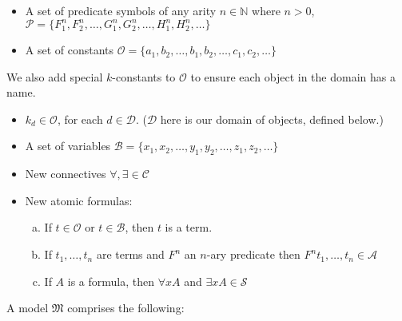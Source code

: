 \begin{itemize}
\item A set of predicate symbols of any arity $n \in\mathbb{N}$ where $n>0$, \\ $\mathcal{P}=\{F^n_1,F^n_2,\dots,G^n_1,G^n_2,\dots,H^n_1,H^n_2,\dots\}$
\item A set of constants $\mathcal{O}=\{a_1,b_2,\dots,b_1,b_2,\dots,c_1,c_2,\dots\}$
\end{itemize}
We also add special $k$-constants to $\mathcal{O}$ to ensure each object in the domain has a name.
\vspace*{-14pt}
\begin{singlespace}
\begin{itemize}
\item $k_d\in\mathcal{O}$, for each $d\in\mathcal{D}$. ($\mathcal{D}$ here is our domain of objects, defined below.)
\item A set of variables $\mathcal{B}=\{x_1,x_2,\dots,y_1,y_2,\dots,z_1,z_2,\dots\}$
\item New connectives $\forall,\exists\in\mathcal{C}$
\item New atomic formulas:
	\begin{enumerate}[(a)]
	\item If $t\in\mathcal{O}$ or $t\in\mathcal{B}$, then $t$ is a term.
	\item If $t_1,\dots,t_n$ are terms and $F^n$ an $n$-ary predicate then $F^nt_1,\dots,t_n\in\mathcal{A}$
	\item If $A$ is a formula, then $\forall xA$ and $\exists xA\in\mathcal{S}$
	\end{enumerate}
\end{itemize}
\end{singlespace}
\noindent A model $\mathfrak{M}$ comprises the following:
\vspace*{-14pt}
